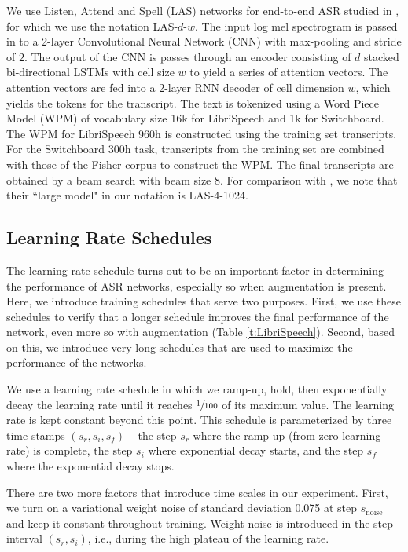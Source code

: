 \documentclass[a4paper]{article}
\begin{document}
We use Listen, Attend and Spell (LAS) networks \cite{Chan2016ListenAA} for end-to-end ASR studied in \cite{irie-arxiv-2019}, for which we use the notation LAS-$d$-$w$. The input log mel spectrogram is passed in to a 2-layer Convolutional Neural Network (CNN) with max-pooling and stride of $2$. The output of the CNN is passes through an encoder consisting of $d$ stacked bi-directional LSTMs with cell size $w$ to yield a series of attention vectors. The attention vectors are fed into a 2-layer RNN decoder of cell dimension $w$, which yields the tokens for the transcript. The text is tokenized using a Word Piece Model (WPM) \cite{schuster-icassp-2012} of vocabulary size 16k for LibriSpeech and 1k for Switchboard. The WPM for LibriSpeech 960h is constructed using the training set transcripts. For the Switchboard 300h task, transcripts from the training set are combined with those of the Fisher corpus to construct the WPM. The final transcripts are obtained by a beam search with beam size 8. For comparison with \cite{irie-arxiv-2019}, we note that their ``large model" in our notation is LAS-4-1024.

\subsection{Learning Rate Schedules}

The learning rate schedule turns out to be an important factor in determining the performance of ASR networks, especially so when augmentation is present. Here, we introduce training schedules that serve two purposes. First, we use these schedules to verify that a longer schedule improves the final performance of the network, even more so with augmentation (Table \ref{t:LibriSpeech}). Second, based on this, we introduce very long schedules that are used to maximize the performance of the networks.

We use a learning rate schedule in which we ramp-up, hold, then exponentially decay the learning rate until it reaches $\sfrac{1}{100}$ of its maximum value. The learning rate is kept constant beyond this point. This schedule is parameterized by three time stamps $(s_r, s_i, s_f)$ -- the step $s_r$ where the ramp-up (from zero learning rate) is complete, the step $s_i$ where exponential decay starts, and the step $s_f$ where the exponential decay stops.

There are two more factors that introduce time scales in our experiment. First, we turn on a variational weight noise \cite{graves-nips-2011} of standard deviation 0.075 at step $s_\text{noise}$ and keep it constant throughout training. Weight noise is introduced in the step interval $(s_r, s_i)$, i.e., during the high plateau of the learning rate.
\end{document}

